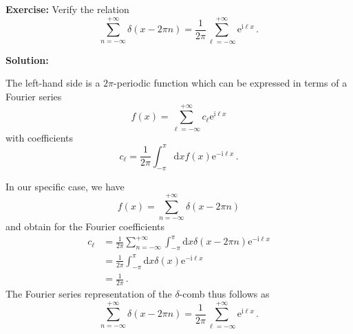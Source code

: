 \documentclass[11pt,DIV=19,parskip=half]{scrartcl}
\begin{document}
\pagestyle{empty}


\vspace{0.5truecm}
\textbf{Exercise:} Verify the relation
\begin{equation}
 \sum_{n=-\infty}^{+\infty}\delta(x-2\pi n)
    = \frac{1}{2\pi}\sum_{\ell=-\infty}^{+\infty}\text{e}^{\text{i}\ell x}\,.
\end{equation}

\vspace{0.5truecm}
\textbf{Solution:}

The left-hand side is a $2\pi$-periodic function which can be expressed in terms
of a Fourier series
\begin{equation}
 f(x) = \sum_{\ell=-\infty}^{+\infty}c_\ell\text{e}^{\text{i}\ell x}
\end{equation}
with coefficients
\begin{equation}
 c_\ell = \frac{1}{2\pi}\int_{-\pi}^\pi\text{d}xf(x)\text{e}^{-\text{i}\ell x}\,.
\end{equation}

In our specific case, we have
\begin{equation}
 f(x) = \sum_{n=-\infty}^{+\infty}\delta(x-2\pi n)
\end{equation}
and obtain for the Fourier coefficients
\begin{equation}
 \begin{aligned}
  c_\ell &= \frac{1}{2\pi}\sum_{n=-\infty}^{+\infty}\int_{-\pi}^\pi\text{d}x
	                      \delta(x-2\pi n)\text{e}^{-\text{i}\ell x}\\
         &= \frac{1}{2\pi}\int_{-\pi}^\pi\text{d}x\delta(x)\text{e}^{-\text{i}\ell x}\\
         &= \frac{1}{2\pi}\,.
 \end{aligned}
\end{equation}
The Fourier series representation of the $\delta$-comb thus follows as
\begin{equation}
 \sum_{n=-\infty}^{+\infty}\delta(x-2\pi n)
    = \frac{1}{2\pi}\sum_{\ell=-\infty}^{+\infty}\text{e}^{\text{i}\ell x}\,.
\end{equation}
\end{document}
